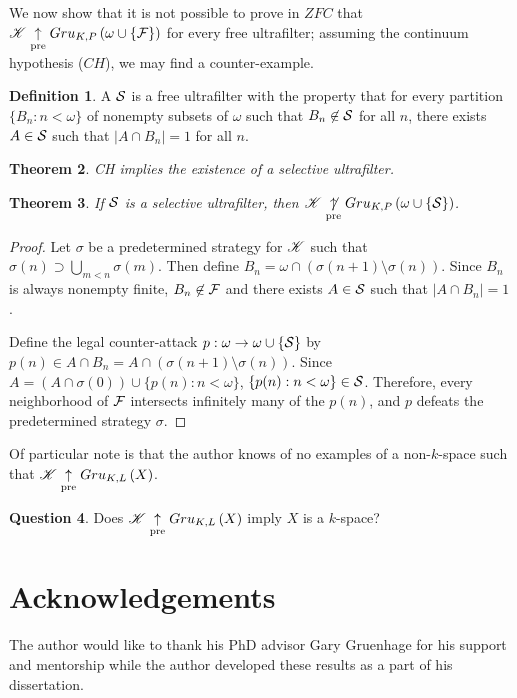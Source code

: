 \documentclass{amsart}
\newtheorem{theorem}{Theorem}[section]
\theoremstyle{definition}
\newtheorem{definition}[theorem]{Definition}
\newtheorem{question}[theorem]{Question}
\begin{document}
We now show that it is not possible to prove in \(ZFC\) that
\(\mathscr{K}\underset{\text{pre}}{\uparrow} Gru_{K,P}\left({\omega\cup\{\mathcal{F}\}}\right)\)
for every free ultrafilter; assuming the continuum hypothesis (\(CH\)),
we may find a counter-example.

\begin{definition}
  A  \(\mathcal{S}\) is a free ultrafilter with the
  property that for every
  partition \(\{B_n : n < \omega\}\) of nonempty subsets of \(\omega\) such that
  \(B_n \not\in \mathcal{S}\) for all \(n\), there exists \(A \in \mathcal{S}\) such
  that \(|A \cap B_n|=1\) for all \(n\).
\end{definition}

\begin{theorem}
  \cite{MR0080902}
  CH implies the existence of a selective ultrafilter.
\end{theorem}

\begin{theorem}
  If \(\mathcal{S}\) is a selective ultrafilter, then
  \(\mathscr{K}\underset{\text{pre}}{\not\uparrow} Gru_{K,P}\left({\omega\cup\{\mathcal{S}\}}\right)\).
\end{theorem}

\begin{proof}
  Let \(\sigma\) be a predetermined strategy for \(\mathscr{K}\) such that
  \(\sigma(n)\supset\bigcup_{m<n}\sigma(m)\).
  Then define \(B_n=\omega\cap(\sigma(n+1)\setminus\sigma(n))\). Since \(B_n\)
  is always nonempty finite, \(B_n\not\in\mathcal{F}\) and there exists \(A\in \mathcal{S}\)
  such that \(|A\cap B_n|=1\).

  Define the legal counter-attack \(p:\omega\to\omega\cup\{\mathcal{S}\}\) by
  \(p(n)\in A\cap B_n=A\cap(\sigma(n+1)\setminus\sigma(n))\). Since
  \(A=(A\cap\sigma(0))\cup\{p(n):n<\omega\}\), \(\{p(n):n<\omega\}\in\mathcal{S}\).
  Therefore, every neighborhood of \(\mathcal{F}\) intersects infinitely many of
  the \(p(n)\), and \(p\) defeats the predetermined strategy \(\sigma\).
\end{proof}

Of particular note is that the author knows of no examples of a
non-\(k\)-space such that \(\mathscr{K}\underset{\text{pre}}{\uparrow}Gru_{K,L}\left({X}\right)\).

\begin{question}
  Does \(\mathscr{K}\underset{\text{pre}}{\uparrow}Gru_{K,L}\left({X}\right)\) imply \(X\) is a \(k\)-space?
\end{question}




\section{Acknowledgements}

The author would like to thank his PhD advisor Gary Gruenhage for his
support and mentorship while the author developed these results as a part of
his dissertation.




\end{document}
